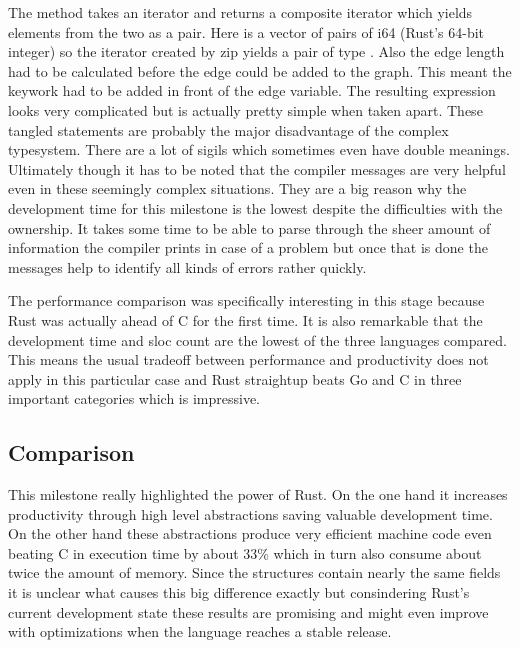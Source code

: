 The  method takes an iterator and returns a composite iterator which yields elements from the two as a pair. Here  is a vector of pairs of i64 (Rust's 64-bit integer) so the iterator created by zip yields a pair of type . Also the edge length had to be calculated before the edge could be added to the graph. This meant the  keywork had to be added in front of the edge variable. The resulting expression  looks very complicated but is actually pretty simple when taken apart. These tangled statements are probably the major disadvantage of the complex typesystem. There are a lot of sigils which sometimes even have double meanings. Ultimately though it has to be noted that the compiler messages are very helpful even in these seemingly complex situations. They are a big reason why the development time for this milestone is the lowest despite the difficulties with the ownership. It takes some time to be able to parse through the sheer amount of information the compiler prints in case of a problem but once that is done the messages help to identify all kinds of errors rather quickly.

The performance comparison was specifically interesting in this stage because Rust was actually ahead of C for the first time. It is also remarkable that the development time and \gls{sloc} count are the lowest of the three languages compared. This means the usual tradeoff between performance and productivity does not apply in this particular case and Rust straightup beats Go and C in three important categories which is impressive.

\subsection{Comparison}
\label{subsec:Implementation::SequentialBenchmark::Comparison}

This milestone really highlighted the power of Rust. On the one hand it increases productivity through high level abstractions saving valuable development time. On the other hand these abstractions produce very efficient machine code even beating C in execution time by about 33\% which in turn also consume about twice the amount of memory. Since the structures contain nearly the same fields it is unclear what causes this big difference exactly but consindering Rust's current development state these results are promising and might even improve with optimizations when the language reaches a stable release.

